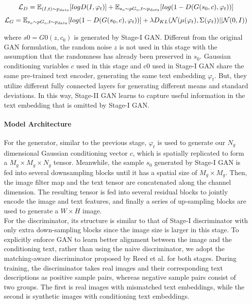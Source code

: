 \documentclass{article}
\begin{document}
$$\mathcal{L_\mathnormal{D}} = \mathbb{E_\mathnormal{(I,t) \sim p_{data} }} [log D(I,\varphi_t)] + \mathbb{E_\mathnormal{s_0 \sim pG_0, t \sim p_{data} }} [log (1-D(G(s_0,c), \varphi_t))]$$
$$\mathcal{L_\mathnormal{G}} =  \mathbb{E_\mathnormal{s_0 \sim pG_0, t \sim p_{data} }} [log (1-D(G(s_0,c), \varphi_t))] + \lambda D_{KL} (\mathcal{N}(\mu(\varphi_t), \Sigma (\varphi_t)) || \mathcal{N}(0,I))$$

where $s0 = G0(z,c_0)$ is generated by Stage-I GAN. Different from the original GAN formulation, the random noise $z$ is not used in this stage with the assumption that the randomness has already been preserved in $s_0$. Gaussian conditioning variables $c$ used in this stage and c0 used in Stage-I GAN share the same pre-trained text encoder, generating the same text embedding $\varphi_t$. But, they utilize different fully connected layers for generating different means and standard deviations. In this way, Stage-II GAN learns to capture useful information in the text embedding that is omitted by Stage-I GAN.

\paragraph{Model Architecture}
For the generator, similar to the previous stage, $\varphi_t$ is used to generate our $N_g$ dimensional
Gaussian conditioning vector $c$, which is spatially replicated to form a $M_g \times M_g \times N_g$ tensor. Meanwhile, the sample $s_0$ generated by Stage-I GAN is fed into several downsampling blocks until it has a spatial size of  $M_g \times M_g$. Then, the image filter map and the text tensor are concatenated along the channel dimension. The resulting tensor is fed into several residual blocks \cite{ percep2016, deepRes2016} to jointly encode the image and text features, and finally a series of up-sampling blocks are used to generate a $W\times H$ image.
\\
For the discriminator, its structure is similar to that of Stage-I discriminator with only extra down-sampling blocks since the image size is larger in this stage. To explicitly enforce GAN to learn better alignment between the image and the conditioning text, rather than using the naive discriminator, we adopt the matching-aware discriminator proposed by Reed et al. \cite{autoEncod2014} for both stages. During training, the discriminator takes real images and their corresponding text descriptions as positive sample pairs, whereas negative sample pairs consist of two groups. The first is real images with mismatched text embeddings, while the second is synthetic images with conditioning text embeddings.
\end{document}
